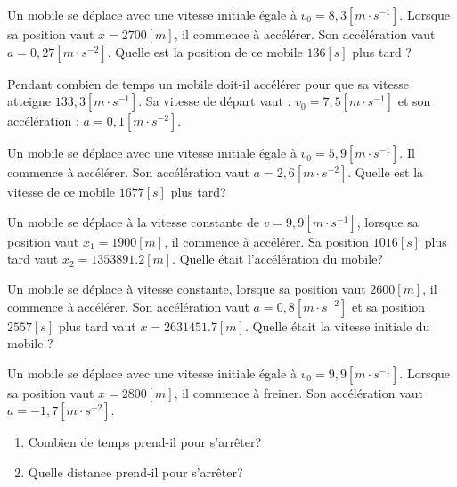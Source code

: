 \begin{exercise}
  Un mobile se déplace avec une vitesse initiale égale à \(v_0=8,3\unit{[m \cdot s^{-1}]}\).
  Lorsque sa position vaut \(x=2700[m]\), il commence à accélérer. Son accélération vaut \(a=0,27\unit{[m \cdot s^{-2}]}\).
  Quelle est la position de ce mobile \(136\unit{[s]}\) plus tard ?
\end{exercise}



\begin{exercise}
  Pendant combien de temps un mobile doit-il accélérer pour que sa vitesse atteigne \(133,3\unit{[m \cdot s^{-1}]}\). Sa vitesse de départ vaut : \(v_0=7,5\unit{[m \cdot s^{-1}]}\) et son accélération : \(a=0,1\unit{[m \cdot s^{-2}]}\).
\end{exercise}


\begin{exercise}
  Un mobile se déplace avec une vitesse initiale égale à \(v_0=5,9\unit{[m \cdot s^{-1}]}\). Il commence à accélérer. Son accélération vaut \(a=2,6\unit{[m \cdot s^{-2}]}\).
  Quelle est la vitesse de ce mobile \(1677\unit{[s]}\) plus tard?
\end{exercise}

\begin{exercise}
  Un mobile se déplace à la vitesse constante de \(v=9,9\unit{[m \cdot s^{-1}]}\), lorsque sa position vaut \(x_1=1900[m]\), il commence à accélérer. Sa position \(1016\unit{[s]}\) plus tard vaut \(x_2=\num{1353891,2}[m]\).
  Quelle était l'accélération du mobile?
\end{exercise}

\begin{exercise}
  Un mobile se déplace à vitesse constante, lorsque sa position vaut \(2600[m]\), il commence à accélérer.
  Son accélération vaut \(a=0,8[m \cdot s^{-2}]\) et sa position \(2557\unit{[s]}\) plus tard vaut \(x=\num{2631451,7}[m]\).
  Quelle était la vitesse initiale du mobile ?
\end{exercise}

\begin{exercise}
  Un mobile se déplace avec une vitesse initiale égale à \(v_0=9,9[m \cdot s^{-1}]\). Lorsque sa position vaut \(x=2800[m]\), il commence à freiner. Son accélération vaut \(a=-1,7[m \cdot s^{-2}]\).
  \begin{enumerate}[label=\alph*)]
    \item Combien de temps prend-il pour s'arrêter?
    \item Quelle distance prend-il pour s'arrêter?
  \end{enumerate}
\end{exercise}

